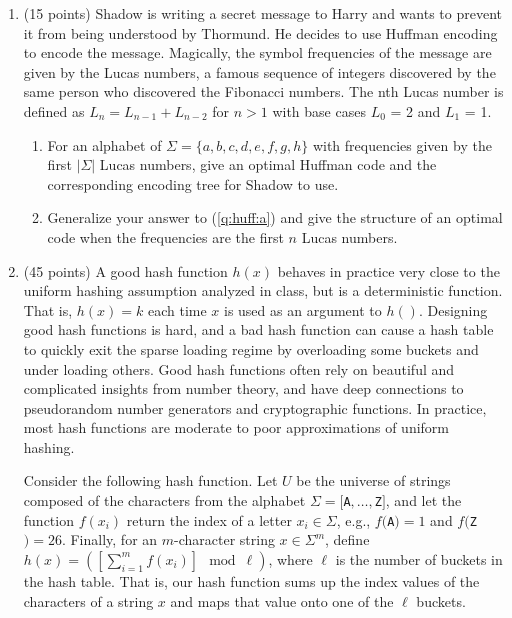 \documentclass[12pt]{article}
\begin{document}
\renewcommand{\headrulewidth}{0.4pt}


\vspace{-3mm}
\begin{enumerate}

	\item (15 points) Shadow is writing a secret message to Harry and wants to prevent it from being understood by Thormund. He decides to use Huffman encoding to encode the message. Magically, the symbol frequencies of the message are given by the Lucas numbers, a famous sequence of integers discovered by the same person who discovered the Fibonacci numbers. The nth Lucas number is defined as $L_n = L_{n-1} + L_{n-2}$ for $n > 1$ with base cases $L_0$ = 2 and $L_1$ = 1.
	\begin{enumerate}
	\item \label{q:huff:a} For an alphabet of $\Sigma=\{a,b,c,d,e,f,g,h\}$ with frequencies given by the first $|\Sigma|$ Lucas numbers, give an optimal Huffman code and the corresponding encoding tree for Shadow to use.
	
	\item Generalize your answer to (\ref{q:huff:a}) and give the structure of an optimal code when the frequencies are the first $n$ Lucas numbers.
	
	\end{enumerate}



	\item (45 points) A good hash function $h(x)$ behaves in practice very close to the uniform hashing assumption analyzed in class, but is a deterministic function. That is, $h(x)=k$ each time $x$ is used as an argument to $h()$. Designing good hash functions is hard, and a bad hash function can cause a hash table to quickly exit the sparse loading regime by overloading some buckets and under loading others. Good hash functions often rely on beautiful and complicated insights from number theory, and have deep connections to pseudorandom number generators and cryptographic functions. In practice, most hash functions are moderate to poor approximations of uniform hashing.
	
	\smallskip Consider the following hash function. Let $U$ be the universe of strings composed of the characters from the alphabet $\Sigma=[${\tt A}$,\dots,${\tt Z}$]$, and let the function $f(x_{i})$ return the index of a letter $x_{i}\in \Sigma$, e.g., $f(${\tt A}$)=1$ and $f(${\tt Z}$)=26$. Finally, for an $m$-character string $x\in \Sigma^{m}$, define $h(x) = \left(\left[\sum_{i=1}^{m}f(x_{i})\right]\!\! \mod \ell\right)$, where $\ell$ is the number of buckets in the hash table. That is, our hash function sums up the index values of the characters of a string $x$ and maps that value onto one of the $\ell$ buckets.
	

\end{enumerate}
\end{document}
